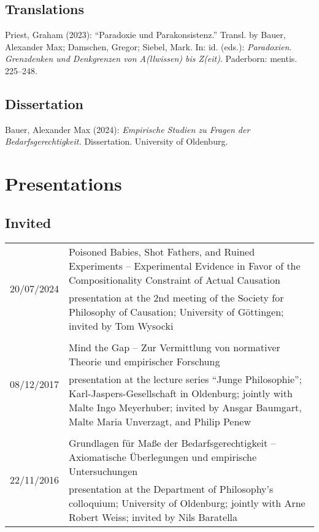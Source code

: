 \documentclass[a4paper,10pt]{article}
\newenvironment{literature}{%
   \parskip6pt\parindent0pt\raggedright
   \def\lititem{\hangindent=1cm\hangafter1}}{%
   \par\ignorespaces}
\begin{document}
\subsection*{Translations}
\begin{literature}
\lititem Priest, Graham (2023): \enquote{Paradoxie und Parakonsistenz.} Transl. by Bauer, Alexander Max; Damschen, Gregor; Siebel, Mark. In: id. (eds.): \textit{Paradoxien. Grenzdenken und Denkgrenzen von A(llwissen) bis Z(eit)}. Paderborn: mentis. 225--248.
\end{literature}


\subsection*{Dissertation}
\begin{literature}
\lititem Bauer, Alexander Max (2024): \textit{Empirische Studien zu Fragen der Bedarfsgerechtigkeit.} Dissertation. University of Oldenburg.
\end{literature}


\clearpage
\section{Presentations}


\subsection*{Invited}
\begin{longtable}{p{2.5cm}p{11cm}}
\multirow{2}{2.5cm}{\footnotesize{20/07/2024}} & Poisoned Babies, Shot Fathers, and Ruined Experiments -- Experimental Evidence in Favor of the Compositionality Constraint of Actual Causation\\
& \footnotesize{presentation at the 2nd meeting of the Society for Philosophy of Causation; University of Göttingen; invited by Tom Wysocki}\\
\\
\multirow{2}{2.5cm}{\footnotesize{08/12/2017}} & Mind the Gap -- Zur Vermittlung von normativer Theorie und empirischer Forschung\\
& \footnotesize{presentation at the lecture series \enquote{Junge Philosophie}; Karl-Jaspers-Gesellschaft in Oldenburg; jointly with Malte Ingo Meyerhuber; invited by Ansgar Baumgart, Malte Maria Unverzagt, and Philip Penew}\\
\\
\multirow{2}{2.5cm}{\footnotesize{22/11/2016}} & Grundlagen für Maße der Bedarfsgerechtigkeit -- Axiomatische Überlegungen und empirische Untersuchungen\\
& \footnotesize{presentation at the Department of Philosophy's colloquium; University of Oldenburg; jointly with Arne Robert Weiss; invited by Nils Baratella}\\
\end{longtable}
\end{document}
